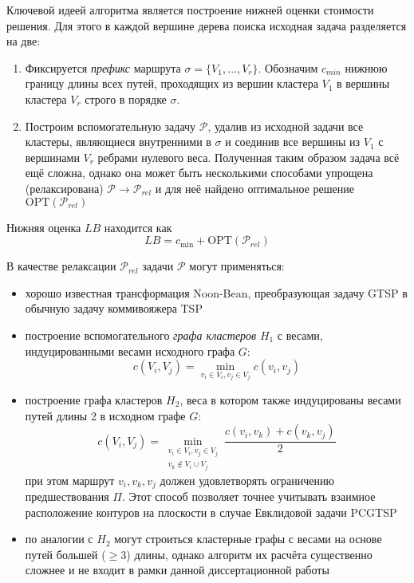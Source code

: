 Ключевой идеей алгоритма является построение нижней оценки стоимости решения.
Для этого в каждой вершине дерева поиска исходная задача разделяется на две:
\begin{enumerate}
    \item 
    Фиксируется {\it префикс}
    маршрута $\sigma=\{V_1, \dots, V_r\}$.
    Обозначим $c_{min}$ нижнюю границу длины
    всех путей, проходящих из вершин кластера $V_1$
    в вершины кластера $V_r$ строго в порядке $\sigma$.
    \item 
    Построим вспомогательную задачу $\mathcal P$,
    удалив из исходной задачи все кластеры,
    являющиеся внутренними в $\sigma$ и 
    соединив все вершины из $V_1$ с вершинами $V_r$
    ребрами нулевого веса.
    Полученная таким образом задача всё ещё сложна,
    однако она может быть несколькими способами
    упрощена (релаксирована) $\mathcal P \to \mathcal P_{rel}$
    и для неё найдено оптимальное решение $\mathrm{OPT}(\mathcal P_{rel})$
\end{enumerate}
Нижняя оценка $LB$
находится как
\begin{equation}
    \label{eq:pcgtsp-lb}
    LB = c_{\min} + \mathrm{OPT}(\mathcal P_{rel})
\end{equation}

В качестве релаксации $\mathcal P_{rel}$ задачи $\mathcal P$
могут применяться:
\begin{itemize}
    \item 
    хорошо известная трансформация Noon-Bean,
    преобразующая задачу GTSP в обычную задачу
    коммивояжера TSP
    \item
    построение вспомогательного {\it графа кластеров} $H_1$
    с весами, индуцированными весами исходного графа $G$:
    $$
    c(V_i, V_j) = \min_{v_i \in V_i, v_j \in V_j} c(v_i, v_j)
    $$
    \item
    построение графа кластеров $H_2$, 
    веса в котором также индуцированы весами путей длины 2 в исходном графе $G$:
    $$
    c(V_i, V_j) = 
        \min_{\substack{v_i \in V_i, v_j \in V_j\\v_k \notin V_i \cup V_j}  } 
        \frac{c(v_i, v_k) + c(v_k, v_j)}{2}
    $$
    при этом маршрут $v_i, v_k, v_j$ должен удовлетворять ограничению предшествования $\Pi$.
    Этот способ позволяет точнее учитывать взаимное расположение контуров на плоскости
    в случае Евклидовой задачи PCGTSP
    \item 
    по аналогии с $H_2$ могут строиться кластерные графы с весами на основе
    путей большей ($\geqslant 3$) длины,
    однако алгоритм их расчёта существенно сложнее и
    не входит в рамки данной диссертационной работы
\end{itemize}

